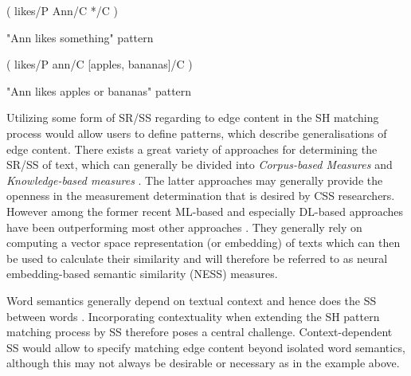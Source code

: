 \documentclass[11pt]{scrreprt}
\let\cite\parencite  %
\begin{document}
\begin{pattern}[h!]
  \normalfont\sffamily
  \centering
  ( likes/P Ann/C */C )
  \caption{"Ann likes something" pattern}
  \label{pat:ann-likes-something}
\end{pattern}

\begin{pattern}[h!]
  \normalfont\sffamily
  \centering
  ( likes/P ann/C [apples, bananas]/C )
  \caption{"Ann likes apples or bananas" pattern}
  \label{pat:ann-likes-apples-and-bananas}
\end{pattern}

Utilizing some form of SR/SS regarding to edge content in the SH matching process would allow users to define patterns, which describe generalisations of edge content. There exists a great variety of approaches for determining the SR/SS of text, which can generally be divided into \textit{Corpus-based Measures} and \textit{Knowledge-based measures} \cite[Section~1.3.2]{harispeSemanticSimilarityNatural2015}. The latter approaches may generally provide the openness in the measurement determination that is desired by CSS researchers. However among the former recent ML-based and especially DL-based approaches have been outperforming most other approaches \cite{chandrasekaranEvolutionSemanticSimilarity2021}. They generally rely on computing a vector space representation (or embedding) of texts which can then be used to calculate their similarity and will therefore be referred to as neural embedding-based semantic similarity (NESS) measures.

Word semantics generally depend on textual context and hence does the SS between words \cite[Section~2.2.3]{harispeSemanticSimilarityNatural2015}. Incorporating contextuality when extending the SH pattern matching process by SS therefore poses a central challenge. Context-dependent SS would allow to specify matching edge content beyond isolated word semantics, although this may not always be desirable or necessary as in the example above. 

\end{document}

